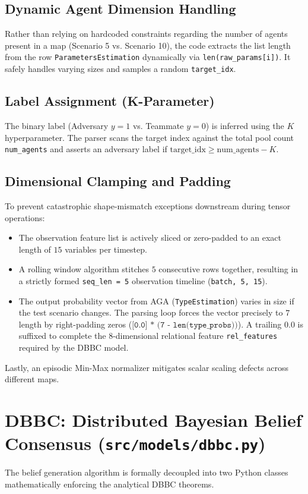 \documentclass[11pt]{article}
\begin{document}
\subsection{Dynamic Agent Dimension Handling}
Rather than relying on hardcoded constraints regarding the number of agents present in a map (Scenario 5 vs. Scenario 10), the code extracts the list length from the row \texttt{ParametersEstimation} dynamically via \texttt{len(raw\_params[i])}. It safely handles varying sizes and samples a random \texttt{target\_idx}.

\subsection{Label Assignment (K-Parameter)}
The binary label (Adversary $y=1$ vs. Teammate $y=0$) is inferred using the $K$ hyperparameter. The parser scans the target index against the total pool count \texttt{num\_agents} and asserts an adversary label if $\text{target\_idx} \ge \text{num\_agents} - K$. 

\subsection{Dimensional Clamping and Padding}
To prevent catastrophic shape-mismatch exceptions downstream during tensor operations:
\begin{itemize}
    \item The observation feature list is actively sliced or zero-padded to an exact length of $15$ variables per timestep.
    \item A rolling window algorithm stitches $5$ consecutive rows together, resulting in a strictly formed \texttt{seq\_len = 5} observation timeline (\texttt{batch, 5, 15}).
    \item The output probability vector from AGA (\texttt{TypeEstimation}) varies in size if the test scenario changes. The parsing loop forces the vector precisely to $7$ length by right-padding zeros ($\texttt{[0.0] * (7 - len(type\_probs))}$). A trailing $0.0$ is suffixed to complete the $8$-dimensional relational feature \texttt{rel\_features} required by the DBBC model.
\end{itemize}
Lastly, an episodic Min-Max normalizer mitigates scalar scaling defects across different maps.

\section{DBBC: Distributed Bayesian Belief Consensus (\texttt{src/models/dbbc.py})}
The belief generation algorithm is formally decoupled into two Python classes mathematically enforcing the analytical DBBC theorems.
\end{document}
